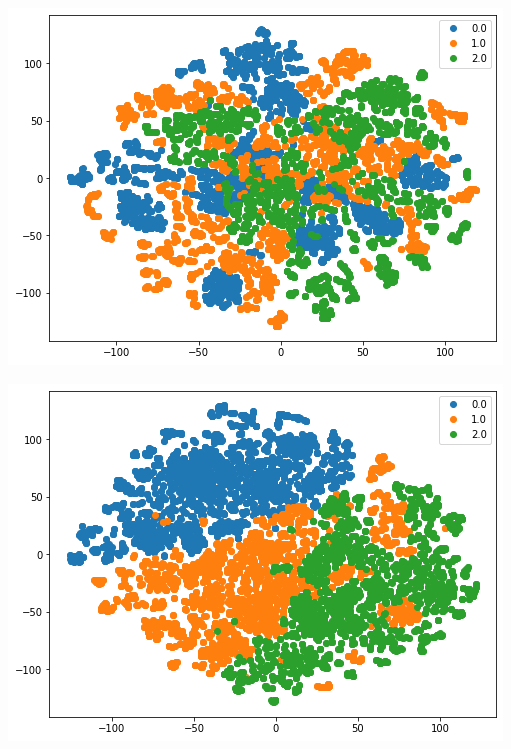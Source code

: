 \documentclass[11pt]{article}
\begin{document}
\begin{center}
\begin{minipage}{0.49\linewidth}
\end{minipage}
\end{center}

\begin{center}
    \begin{minipage}{0.48\linewidth}
    \includegraphics[width=\linewidth]{output_squeezeNet_v2_0epoch.png}
    \end{minipage}%
    \begin{minipage}{0.49\linewidth}
    \includegraphics[width=\linewidth]{output_squeezeNet_v2_30epoch.png}
    \end{minipage}
\end{center}
\end{document}
